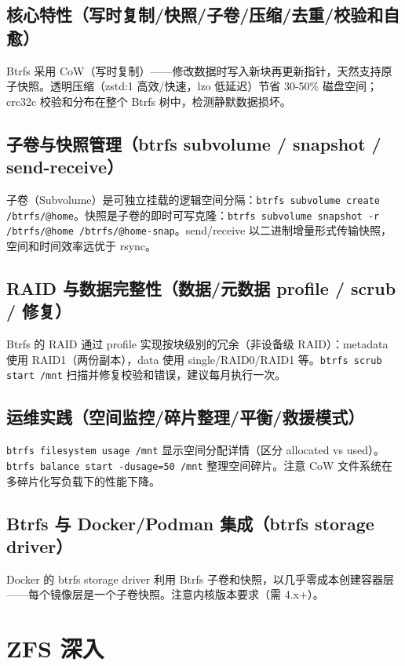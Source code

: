 \documentclass[12pt,UTF8]{ctexbook}
\begin{document}
    \subsection{核心特性（写时复制/快照/子卷/压缩/去重/校验和自愈）}

Btrfs 采用 CoW（写时复制）——修改数据时写入新块再更新指针，天然支持原子快照。透明压缩（zstd:1 高效/快速，lzo 低延迟）节省 30-50\% 磁盘空间；crc32c 校验和分布在整个 Btrfs 树中，检测静默数据损坏。

    \subsection{子卷与快照管理（btrfs subvolume / snapshot / send-receive）}

子卷（Subvolume）是可独立挂载的逻辑空间分隔：\verb|btrfs subvolume create /btrfs/@home|。快照是子卷的即时可写克隆：\verb|btrfs subvolume snapshot -r /btrfs/@home /btrfs/@home-snap|。send/receive 以二进制增量形式传输快照，空间和时间效率远优于 rsync。

    \subsection{RAID 与数据完整性（数据/元数据 profile / scrub / 修复）}

Btrfs 的 RAID 通过 profile 实现按块级别的冗余（非设备级 RAID）：metadata 使用 RAID1（两份副本），data 使用 single/RAID0/RAID1 等。\verb|btrfs scrub start /mnt| 扫描并修复校验和错误，建议每月执行一次。

    \subsection{运维实践（空间监控/碎片整理/平衡/救援模式）}

\verb|btrfs filesystem usage /mnt| 显示空间分配详情（区分 allocated vs used）。\verb|btrfs balance start -dusage=50 /mnt| 整理空间碎片。注意 CoW 文件系统在多碎片化写负载下的性能下降。

    \subsection{Btrfs 与 Docker/Podman 集成（btrfs storage driver）}

Docker 的 btrfs storage driver 利用 Btrfs 子卷和快照，以几乎零成本创建容器层——每个镜像层是一个子卷快照。注意内核版本要求（需 4.x+）。

  \section{ZFS 深入}
\end{document}
